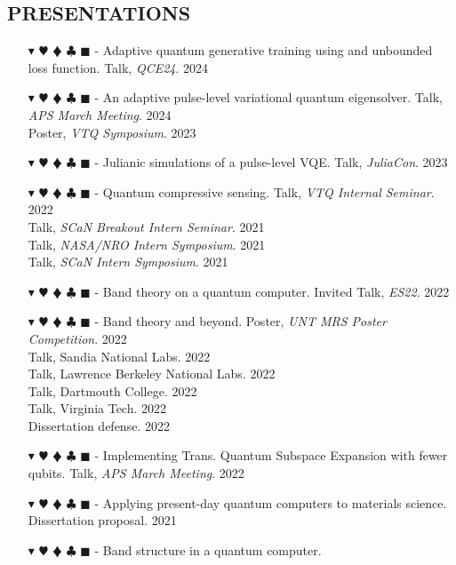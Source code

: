 \documentclass[overlapped, 10pt]{res} %
\newcommand{\physics}{$\blacktriangledown$}
\newcommand{\biochem}{$\varheartsuit$}
\newcommand{\shannon}{$\vardiamondsuit$}
\newcommand{\classic}{$\clubsuit$}
\newcommand{\quantum}{$\blacksquare$}
\newcommand{\physicscolor}{\color{YellowOrange}}
\newcommand{\biochemcolor}{\color{Emerald}}
\newcommand{\shannoncolor}{\color{Goldenrod}}
\newcommand{\classiccolor}{\color{Cyan}}
\newcommand{\quantumcolor}{\color{RedOrange}}
\newcommand{\tag}[1]{
    {\IfSubStr{#1}{\physics}{\physicscolor}{\color{White}}\physics}
    {\IfSubStr{#1}{\biochem}{\biochemcolor}{\color{White}}\biochem}
    {\IfSubStr{#1}{\shannon}{\shannoncolor}{\color{White}}\shannon}
    {\IfSubStr{#1}{\classic}{\classiccolor}{\color{White}}\classic}
    {\IfSubStr{#1}{\quantum}{\quantumcolor}{\color{White}}\quantum}
}
\begin{document}
\begin{resume}
\section{PRESENTATIONS}
\begin{itemize} \itemsep -2pt %
\item[\tag{\physics\shannon\quantum}-] Adaptive quantum generative training using and unbounded loss function.
    \hfill Talk, \textit{QCE24}. 2024
\item[\tag{\physics\biochem\shannon\quantum}-] An adaptive pulse-level variational quantum eigensolver.
    \hfill Talk, \textit{APS March Meeting}. 2024
    \\ \null \hfill Poster, \textit{VTQ Symposium}. 2023
\item[\tag{\physics\biochem\classic\quantum}-] Julianic simulations of a pulse-level VQE.
    \hfill Talk, \textit{JuliaCon}. 2023
\item[\tag{\shannon\quantum}-] Quantum compressive sensing.
    \hfill Talk, \textit{VTQ Internal Seminar}. 2022
    \\ \null \hfill Talk, \textit{SCaN Breakout Intern Seminar}. 2021
    \\ \null \hfill Talk, \textit{NASA/NRO Intern Symposium}. 2021
    \\ \null \hfill Talk, \textit{SCaN Intern Symposium}. 2021
\item[\tag{\physics\quantum}-] Band theory on a quantum computer.
    \hfill Invited Talk, \textit{ES22}. 2022
\item[\tag{\physics\biochem\shannon\quantum}-] Band theory and beyond.
    \hfill Poster, \textit{UNT MRS Poster Competition}. 2022
    \\ \null \hfill Talk, Sandia National Labs. 2022
    \\ \null \hfill Talk, Lawrence Berkeley National Labs. 2022
    \\ \null \hfill Talk, Dartmouth College. 2022
    \\ \null \hfill Talk, Virginia Tech. 2022
    \\ \null \hfill Dissertation defense. 2022
\item[\tag{\physics\quantum}-] Implementing Trans. Quantum Subspace Expansion with fewer qubits.
    \hfill Talk, \textit{APS March Meeting}. 2022
\item[\tag{\physics\biochem\quantum}-] Applying present-day quantum computers to materials science.
    \hfill Dissertation proposal. 2021
\item[\tag{\physics\quantum}-] Band structure in a quantum computer.

\end{itemize}
\end{resume}
\end{document}
